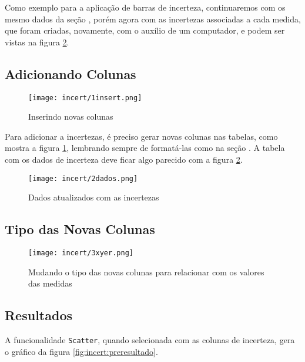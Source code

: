 Como exemplo para a aplicação de barras de incerteza, continuaremos com os mesmo dados da seção , porém agora com as incertezas associadas a cada medida, que foram criadas, novamente, com o auxílio de um computador, e podem ser vistas na figura \ref{fig:incert:dados}.


\subsection{Adicionando Colunas}

    \begin{figure}[htbp]
        \centering
        \texttt{[image: incert/1insert.png]}

        \caption{Inserindo novas colunas}
        \label{fig:incert:colunas}
    \end{figure}

    Para adicionar a incertezas, é preciso gerar novas colunas nas tabelas, como mostra a figura \ref{fig:incert:colunas}, lembrando sempre de formatá-las como na seção . A tabela com os dados de incerteza deve ficar algo parecido com a figura \ref{fig:incert:dados}.

    \begin{figure}[htbp]
        \centering
        \texttt{[image: incert/2dados.png]}

        \caption{Dados atualizados com as incertezas}
        \label{fig:incert:dados}
    \end{figure}


\subsection{Tipo das Novas Colunas}

    \begin{figure}[htbp]
        \centering
        \texttt{[image: incert/3xyer.png]}
        \caption{Mudando o tipo das novas colunas para relacionar com os valores das medidas}
        \label{fig:incert:tipos}
    \end{figure}


\subsection{Resultados}

    A funcionalidade \texttt{Scatter}, quando selecionada com as colunas de incerteza, gera o gráfico da figura \ref{fig:incert:preresultado}.

